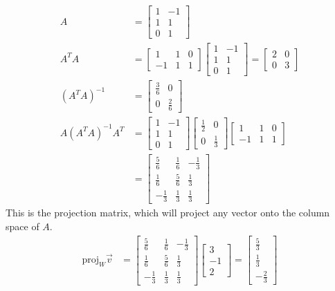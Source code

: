 \documentclass{math}
\begin{document}
\begin{align*}
  A &= \begin{bmatrix}
    1 & -1 \\
    1 & 1 \\
    0 & 1
  \end{bmatrix} \\
  A^TA &= \begin{bmatrix}
    1 & 1 & 0 \\
    -1 & 1 & 1
  \end{bmatrix}\begin{bmatrix}
    1 & -1 \\
    1 & 1 \\
    0 & 1
  \end{bmatrix} = \begin{bmatrix}
    2 & 0 \\
    0 & 3
  \end{bmatrix} \\
  (A^TA)^{-1} &= \begin{bmatrix}
    \frac{3}{6} & 0 \\
    0 & \frac{2}{6}
  \end{bmatrix} \\
  A(A^TA)^{-1}A^T &= \begin{bmatrix}
    1 & -1 \\
    1 & 1 \\
    0 & 1
  \end{bmatrix}\begin{bmatrix}
    \frac{1}{2} & 0 \\
    0 & \frac{1}{3}
  \end{bmatrix}\begin{bmatrix}
    1 & 1 & 0 \\
    -1 & 1 & 1
  \end{bmatrix} \\
  &= \begin{bmatrix}
    \frac{5}{6} & \frac{1}{6} & -\frac{1}{3} \\
    \frac{1}{6} & \frac{5}{6} & \frac{1}{3} \\
    -\frac{1}{3} & \frac{1}{3} & \frac{1}{3}
  \end{bmatrix}
\end{align*}
This is the projection matrix, which will project any vector onto the column
space of \( A \).
\begin{align*}
  \text{proj}_W\vec{v} &= \begin{bmatrix}
    \frac{5}{6} & \frac{1}{6} & -\frac{1}{3} \\
    \frac{1}{6} & \frac{5}{6} & \frac{1}{3} \\
    -\frac{1}{3} & \frac{1}{3} & \frac{1}{3}
  \end{bmatrix}\begin{bmatrix}3 \\ -1 \\ 2\end{bmatrix} = \begin{bmatrix}
    \frac{5}{3} \\ \frac{1}{3} \\ -\frac{2}{3}
  \end{bmatrix}
\end{align*}
\end{document}
